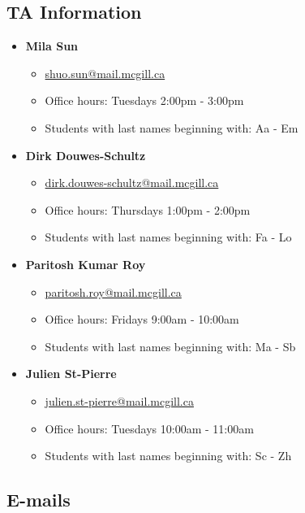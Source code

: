 \documentclass[]{article}
\begin{document}
\newpage

\subsection{TA Information}
\begin{itemize}
	\item \textbf{Mila Sun}
	\begin{itemize}
		\item \href{mailto:shuo.sun@mail.mcgill.ca}{shuo.sun@mail.mcgill.ca}
		\item Office hours: Tuesdays 2:00pm - 3:00pm
		\item Students with last names beginning with: Aa - Em
	\end{itemize}
	\item \textbf{Dirk Douwes-Schultz}
\begin{itemize}
	\item \href{mailto:dirk.douwes-schultz@mail.mcgill.ca}{dirk.douwes-schultz@mail.mcgill.ca}
	\item Office hours: Thursdays 1:00pm - 2:00pm
	\item Students with last names beginning with: Fa - Lo
\end{itemize}
	\item \textbf{Paritosh Kumar Roy}
\begin{itemize}
	\item \href{mailto:paritosh.roy@mail.mcgill.ca}{paritosh.roy@mail.mcgill.ca}
	\item Office hours: Fridays 9:00am - 10:00am
	\item Students with last names beginning with: Ma - Sb
\end{itemize}
	\item \textbf{Julien St-Pierre}
\begin{itemize}
	\item \href{mailto:julien.st-pierre@mail.mcgill.ca}{julien.st-pierre@mail.mcgill.ca}
	\item Office hours: Tuesdays 10:00am - 11:00am
	\item Students with last names beginning with: Sc - Zh
\end{itemize}
\end{itemize}

\subsection{E-mails}
\end{document}
